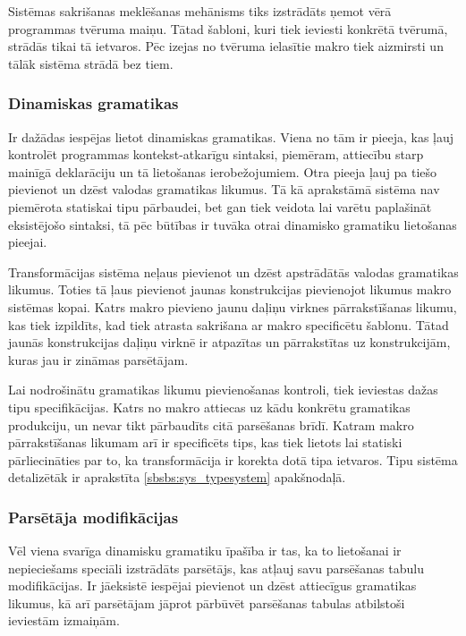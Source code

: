 Sistēmas sakrišanas meklēšanas mehānisms tiks izstrādāts ņemot vērā programmas tvēruma maiņu. Tātad šabloni, kuri tiek ieviesti konkrētā tvērumā, strādās tikai tā ietvaros. Pēc izejas no tvēruma ielasītie makro tiek aizmirsti un tālāk sistēma strādā bez tiem.

\subsubsection{\label{sbsbs:sys_dynamicgrammars}Dinamiskas gramatikas}

Ir dažādas iespējas lietot dinamiskas gramatikas. Viena no tām ir pieeja, kas ļauj kontrolēt programmas kontekst-atkarīgu sintaksi, piemēram, attiecību starp mainīgā deklarāciju un tā lietošanas ierobežojumiem. Otra pieeja ļauj pa tiešo pievienot un dzēst valodas gramatikas likumus. Tā kā aprakstāmā sistēma nav piemērota statiskai tipu pārbaudei, bet gan tiek veidota lai varētu paplašināt eksistējošo sintaksi, tā pēc būtības ir tuvāka otrai dinamisko gramatiku lietošanas pieejai.

Transformācijas sistēma neļaus pievienot un dzēst apstrādātās valodas gramatikas likumus. Toties tā ļaus pievienot jaunas konstrukcijas pievienojot likumus makro sistēmas kopai. Katrs makro pievieno jaunu daļiņu virknes pārrakstīšanas likumu, kas tiek izpildīts, kad tiek atrasta sakrišana ar makro specificētu šablonu. Tātad jaunās konstrukcijas daļiņu virknē ir atpazītas un pārrakstītas uz konstrukcijām, kuras jau ir zināmas parsētājam.

Lai nodrošinātu gramatikas likumu pievienošanas kontroli, tiek ieviestas dažas tipu specifikācijas. Katrs no makro attiecas uz kādu konkrētu gramatikas produkciju, un nevar tikt pārbaudīts citā parsēšanas brīdī. Katram makro pārrakstīšanas likumam arī ir specificēts tips, kas tiek lietots lai statiski pārliecināties par to, ka transformācija ir korekta dotā tipa ietvaros. Tipu sistēma detalizētāk ir aprakstīta \ref{sbsbs:sys_typesystem} apakšnodaļā.

\subsubsection{\label{sbsbs:sys_parsermodifications}Parsētāja modifikācijas}

Vēl viena svarīga dinamisku gramatiku īpašība ir tas, ka to lietošanai ir nepieciešams speciāli izstrādāts parsētājs, kas atļauj savu parsēšanas tabulu modifikācijas. Ir jāeksistē iespējai pievienot un dzēst attiecīgus gramatikas likumus, kā arī parsētājam jāprot pārbūvēt parsēšanas tabulas atbilstoši ieviestām izmaiņām.


